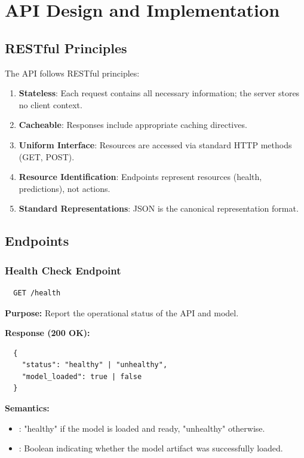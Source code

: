 \section{API Design and Implementation}
\label{sec:api}

\subsection{RESTful Principles}

The API follows RESTful principles:

\begin{enumerate}
  \item \textbf{Stateless}: Each request contains all necessary information; the server stores no client context.
  \item \textbf{Cacheable}: Responses include appropriate caching directives.
  \item \textbf{Uniform Interface}: Resources are accessed via standard HTTP methods (GET, POST).
  \item \textbf{Resource Identification}: Endpoints represent resources (health, predictions), not actions.
  \item \textbf{Standard Representations}: JSON is the canonical representation format.
\end{enumerate}

\subsection{Endpoints}

\subsubsection{Health Check Endpoint}

\begin{verbatim}
  GET /health
\end{verbatim}

\textbf{Purpose:} Report the operational status of the API and model.

\textbf{Response (200 OK):}
\begin{verbatim}
  {
    "status": "healthy" | "unhealthy",
    "model_loaded": true | false
  }
\end{verbatim}

\textbf{Semantics:}
\begin{itemize}
  \item {}: "healthy" if the model is loaded and ready, "unhealthy" otherwise.
  \item {}: Boolean indicating whether the model artifact was successfully loaded.
\end{itemize}

